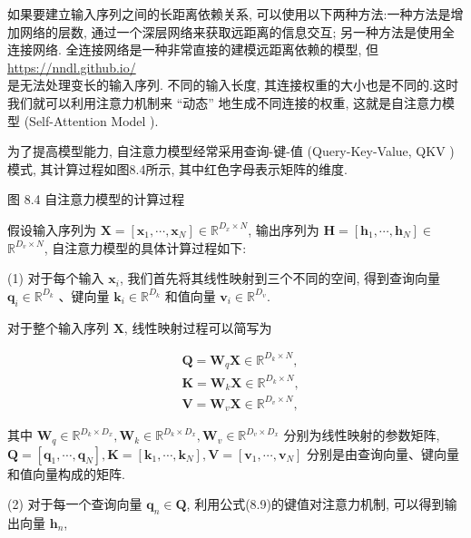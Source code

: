 \documentclass[10pt]{article}
\begin{document}
如果要建立输入序列之间的长距离依赖关系, 可以使用以下两种方法:一种方法是增加网络的层数, 通过一个深层网络来获取远距离的信息交互; 另一种方法是使用全连接网络. 全连接网络是一种非常直接的建模远距离依赖的模型, 但 \href{https://nndl.github.io/}{https://nndl.github.io/}\\
是无法处理变长的输入序列. 不同的输入长度, 其连接权重的大小也是不同的.这时我们就可以利用注意力机制来 “动态” 地生成不同连接的权重, 这就是自注意力模型 (Self-Attention Model ).

为了提高模型能力, 自注意力模型经常采用查询-键-值 (Query-Key-Value, QKV ) 模式, 其计算过程如图8.4所示, 其中红色字母表示矩阵的维度.



图 8.4 自注意力模型的计算过程

假设输入序列为 $\boldsymbol{X}=\left[\boldsymbol{x}_{1}, \cdots, \boldsymbol{x}_{N}\right] \in \mathbb{R}^{D_{x} \times N}$, 输出序列为 $\boldsymbol{H}=\left[\boldsymbol{h}_{1}, \cdots, \boldsymbol{h}_{N}\right] \in$ $\mathbb{R}^{D_{v} \times N}$, 自注意力模型的具体计算过程如下:

(1) 对于每个输入 $\boldsymbol{x}_{i}$, 我们首先将其线性映射到三个不同的空间, 得到查询向量 $\boldsymbol{q}_{i} \in \mathbb{R}^{D_{k}}$ 、键向量 $\boldsymbol{k}_{i} \in \mathbb{R}^{D_{k}}$ 和值向量 $\boldsymbol{v}_{i} \in \mathbb{R}^{D_{v}}$.

对于整个输入序列 $\boldsymbol{X}$, 线性映射过程可以简写为


\begin{align*}
& \boldsymbol{Q}=\boldsymbol{W}_{q} \boldsymbol{X} \in \mathbb{R}^{D_{k} \times N},  \tag{8.16}\\
& \boldsymbol{K}=\boldsymbol{W}_{k} \boldsymbol{X} \in \mathbb{R}^{D_{k} \times N},  \tag{8.17}\\
& \boldsymbol{V}=\boldsymbol{W}_{v} \boldsymbol{X} \in \mathbb{R}^{D_{v} \times N}, \tag{8.18}
\end{align*}


其中 $\boldsymbol{W}_{q} \in \mathbb{R}^{D_{k} \times D_{x}}, \boldsymbol{W}_{k} \in \mathbb{R}^{D_{k} \times D_{x}}, \boldsymbol{W}_{v} \in \mathbb{R}^{D_{v} \times D_{x}}$ 分别为线性映射的参数矩阵, $\boldsymbol{Q}=\left[\boldsymbol{q}_{1}, \cdots, \boldsymbol{q}_{N}\right], \boldsymbol{K}=\left[\boldsymbol{k}_{1}, \cdots, \boldsymbol{k}_{N}\right], \boldsymbol{V}=\left[\boldsymbol{v}_{1}, \cdots, \boldsymbol{v}_{N}\right]$ 分别是由查询向量、键向量和值向量构成的矩阵.

(2) 对于每一个查询向量 $\boldsymbol{q}_{n} \in \boldsymbol{Q}$, 利用公式(8.9)的键值对注意力机制, 可以得到输出向量 $\boldsymbol{h}_{n}$,
\end{document}
